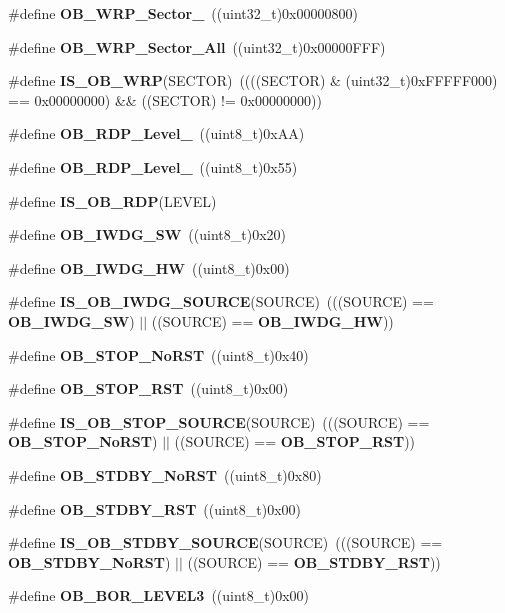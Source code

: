 \begin{DoxyCompactItemize}
\#define \textbf{ O\+B\+\_\+\+W\+R\+P\+\_\+\+Sector\+\_}~((uint32\+\_\+t)0x00000800)
\item 
\#define \textbf{ O\+B\+\_\+\+W\+R\+P\+\_\+\+Sector\+\_\+\+All}~((uint32\+\_\+t)0x00000\+F\+F\+F)
\item 
\#define \textbf{ I\+S\+\_\+\+O\+B\+\_\+\+W\+RP}(S\+E\+C\+T\+OR)~((((S\+E\+C\+T\+OR) \& (uint32\+\_\+t)0x\+F\+F\+F\+F\+F000) == 0x00000000) \&\& ((\+S\+E\+C\+T\+O\+R) != 0x00000000))
\item 
\#define \textbf{ O\+B\+\_\+\+R\+D\+P\+\_\+\+Level\+\_}~((uint8\+\_\+t)0x\+A\+A)
\item 
\#define \textbf{ O\+B\+\_\+\+R\+D\+P\+\_\+\+Level\+\_}~((uint8\+\_\+t)0x55)
\item 
\#define \textbf{ I\+S\+\_\+\+O\+B\+\_\+\+R\+DP}(L\+E\+V\+EL)
\item 
\#define \textbf{ O\+B\+\_\+\+I\+W\+D\+G\+\_\+\+SW}~((uint8\+\_\+t)0x20)
\item 
\#define \textbf{ O\+B\+\_\+\+I\+W\+D\+G\+\_\+\+HW}~((uint8\+\_\+t)0x00)
\item 
\#define \textbf{ I\+S\+\_\+\+O\+B\+\_\+\+I\+W\+D\+G\+\_\+\+S\+O\+U\+R\+CE}(S\+O\+U\+R\+CE)~(((S\+O\+U\+R\+CE) == \textbf{ O\+B\+\_\+\+I\+W\+D\+G\+\_\+\+SW}) $\vert$$\vert$ ((S\+O\+U\+R\+CE) == \textbf{ O\+B\+\_\+\+I\+W\+D\+G\+\_\+\+HW}))
\item 
\#define \textbf{ O\+B\+\_\+\+S\+T\+O\+P\+\_\+\+No\+R\+ST}~((uint8\+\_\+t)0x40)
\item 
\#define \textbf{ O\+B\+\_\+\+S\+T\+O\+P\+\_\+\+R\+ST}~((uint8\+\_\+t)0x00)
\item 
\#define \textbf{ I\+S\+\_\+\+O\+B\+\_\+\+S\+T\+O\+P\+\_\+\+S\+O\+U\+R\+CE}(S\+O\+U\+R\+CE)~(((S\+O\+U\+R\+CE) == \textbf{ O\+B\+\_\+\+S\+T\+O\+P\+\_\+\+No\+R\+ST}) $\vert$$\vert$ ((S\+O\+U\+R\+CE) == \textbf{ O\+B\+\_\+\+S\+T\+O\+P\+\_\+\+R\+ST}))
\item 
\#define \textbf{ O\+B\+\_\+\+S\+T\+D\+B\+Y\+\_\+\+No\+R\+ST}~((uint8\+\_\+t)0x80)
\item 
\#define \textbf{ O\+B\+\_\+\+S\+T\+D\+B\+Y\+\_\+\+R\+ST}~((uint8\+\_\+t)0x00)
\item 
\#define \textbf{ I\+S\+\_\+\+O\+B\+\_\+\+S\+T\+D\+B\+Y\+\_\+\+S\+O\+U\+R\+CE}(S\+O\+U\+R\+CE)~(((S\+O\+U\+R\+CE) == \textbf{ O\+B\+\_\+\+S\+T\+D\+B\+Y\+\_\+\+No\+R\+ST}) $\vert$$\vert$ ((S\+O\+U\+R\+CE) == \textbf{ O\+B\+\_\+\+S\+T\+D\+B\+Y\+\_\+\+R\+ST}))
\item 
\#define \textbf{ O\+B\+\_\+\+B\+O\+R\+\_\+\+L\+E\+V\+E\+L3}~((uint8\+\_\+t)0x00)
\item 
$$
\end{DoxyCompactItemize}
